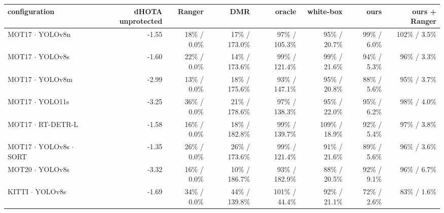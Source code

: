 \begin{tabular}{lrrrrrrr}
\toprule
configuration & dHOTA unprotected & Ranger & DMR & oracle & white-box & ours & ours + Ranger \\
\midrule
MOT17 $\cdot$ YOLOv8n & -1.55 & 18\% / 0.0\% & 17\% / 173.0\% & 97\% / 105.3\% & 95\% / 20.7\% & 99\% / 6.0\% & 102\% / 3.5\% \\
MOT17 $\cdot$ YOLOv8s & -1.60 & 22\% / 0.0\% & 14\% / 173.6\% & 99\% / 121.4\% & 99\% / 21.6\% & 94\% / 5.3\% & 96\% / 3.3\% \\
MOT17 $\cdot$ YOLOv8m & -2.99 & 13\% / 0.0\% & 18\% / 175.6\% & 93\% / 147.1\% & 95\% / 20.8\% & 88\% / 5.6\% & 95\% / 3.7\% \\
MOT17 $\cdot$ YOLO11s & -3.25 & 36\% / 0.0\% & 21\% / 178.6\% & 97\% / 138.3\% & 95\% / 22.0\% & 95\% / 6.2\% & 98\% / 4.0\% \\
MOT17 $\cdot$ RT-DETR-L & -1.58 & 16\% / 0.0\% & 18\% / 182.8\% & 99\% / 139.7\% & 109\% / 18.9\% & 92\% / 5.4\% & 97\% / 3.8\% \\
MOT17 $\cdot$ YOLOv8s $\cdot$ SORT & -1.35 & 26\% / 0.0\% & 26\% / 173.6\% & 99\% / 121.4\% & 91\% / 21.6\% & 89\% / 5.6\% & 96\% / 3.6\% \\
MOT20 $\cdot$ YOLOv8s & -3.32 & 16\% / 0.0\% & 10\% / 186.7\% & 93\% / 182.9\% & 88\% / 20.5\% & 92\% / 9.1\% & 96\% / 6.7\% \\
KITTI $\cdot$ YOLOv8s & -1.69 & 34\% / 0.0\% & 44\% / 139.8\% & 101\% / 44.4\% & 92\% / 21.1\% & 72\% / 2.6\% & 83\% / 1.6\% \\
\bottomrule
\end{tabular}

